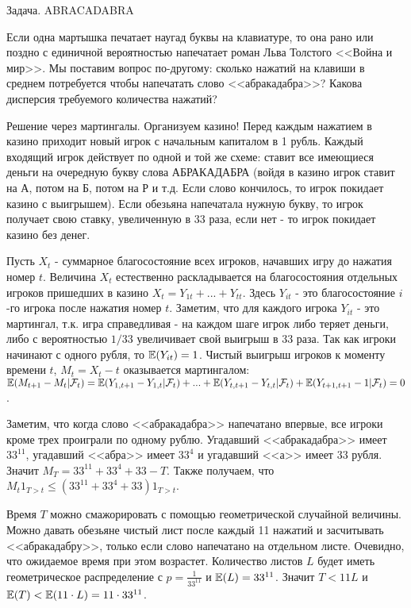 {Задача. ABRACADABRA \cite{ross:scp}\cite{williams:pwm}

Если одна мартышка печатает наугад буквы на клавиатуре, то она рано или поздно с единичной вероятностью напечатает роман Льва Толстого <<Война и мир>>. Мы поставим вопрос по-другому: сколько нажатий на клавиши в среднем потребуется чтобы напечатать слово <<абракадабра>>? Какова дисперсия требуемого количества нажатий?

Решение через мартингалы.  Организуем казино! Перед каждым нажатием в казино приходит
новый игрок с начальным капиталом в 1 рубль. Каждый входящий игрок
действует по одной и той же схеме: ставит все имеющиеся деньги на
очередную букву слова АБРАКАДАБРА (войдя в казино игрок ставит на А, потом на Б, потом на Р и т.д. Если слово кончилось, то игрок покидает казино с выигрышем). Если обезьяна напечатала нужную букву, то игрок получает свою ставку, увеличенную в 33 раза, если нет - то игрок покидает казино без денег.

Пусть $X_{t}$ - суммарное благосостояние всех игроков, начавших игру до нажатия номер $t$. Величина $X_{t}$ естественно раскладывается на благосостояния отдельных игроков пришедших в казино $X_{t}=Y_{1t}+...+Y_{tt}$. Здесь $Y_{it}$ - это благосостояние $i$-го игрока после нажатия номер $t$. Заметим, что для каждого игрока $Y_{it}$ - это мартингал, т.к. игра справедливая - на каждом шаге игрок либо теряет деньги, либо с вероятностью $1/33$ увеличивает свой выигрыш в 33 раза. Так как игроки начинают с одного рубля, то $\mathbb{E}(Y_{it})=1$. Чистый выигрыш игроков к моменту времени $t$, $M_{t}=X_{t}-t$ оказывается мартингалом: $\mathbb{E}(M_{t+1}-M_{t}|\mathcal{F}_{t})=\mathbb{E}(Y_{1,t+1}-Y_{1,t}|\mathcal{F}_{t})+...+\mathbb{E}(Y_{t,t+1}-Y_{t,t}|\mathcal{F}_{t})+\mathbb{E}(Y_{t+1,t+1}-1|\mathcal{F}_{t})=0$.

Заметим, что когда слово <<абракадабра>> напечатано впервые, все игроки кроме трех проиграли по одному рублю. Угадавший <<абракадабра>> имеет $33^{11}$, угадавший <<абра>> имеет $33^{4}$ и угадавший <<а>> имеет $33$ рубля. Значит $M_{T}=33^{11}+33^{4}+33-T$. Также получаем, что $M_{t}1_{T>t}\leq (33^{11}+33^{4}+33)1_{T>t}$.

Время $T$ можно смажорировать с помощью геометрической случайной величины. Можно давать обезьяне чистый лист после каждый 11 нажатий и засчитывать <<абракадабру>>, только если слово напечатано на отдельном листе. Очевидно, что ожидаемое время при этом возрастет. Количество листов $L$ будет иметь геометрическое распределение с $p=\frac{1}{33^{11}}$ и $\mathbb{E}(L)=33^{11}$. Значит $T<11L$ и $\mathbb{E}(T)<\mathbb{E}(11\cdot L)=11\cdot 33^{11}$.

}
